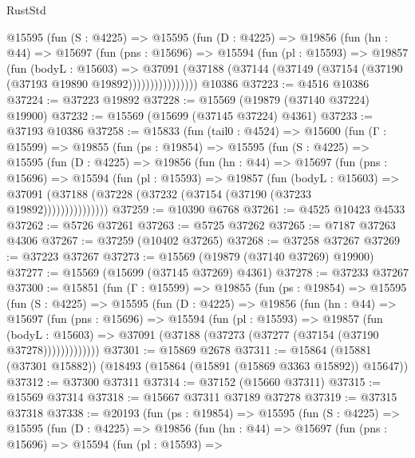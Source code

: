 \begin{lexlean}{RustStd}
\begin{coremodule}
          @15595
            (fun (S : @4225) =>
            @15595
              (fun (D : @4225) =>
              @19856
                (fun (hn : @44) =>
                @15697
                  (fun (pns : @15696) =>
                  @15594
                    (fun (pl : @15593) =>
                    @19857
                      (fun (bodyL : @15603) =>
                      @37091
                        (@37188
                          (@37144 (@37149 (@37154 (@37190 (@37193 @19890 @19892))))))))))))))))
    @10386
@37223 := @4516 @10386
@37224 := @37223 @19892
@37228 := @15569 (@19879 (@37140 @37224) @19900)
@37232 := @15569 (@15699 (@37145 @37224) @4361)
@37233 := @37193 @10386
@37258 := @15833
    (fun (tail0 : @4524) =>
    @15600
      (fun (Γ : @15599) =>
      @19855
        (fun (ps : @19854) =>
        @15595
          (fun (S : @4225) =>
          @15595
            (fun (D : @4225) =>
            @19856
              (fun (hn : @44) =>
              @15697
                (fun (pns : @15696) =>
                @15594
                  (fun (pl : @15593) =>
                  @19857
                    (fun (bodyL : @15603) =>
                    @37091 (@37188 (@37228 (@37232 (@37154 (@37190 (@37233 @19892)))))))))))))))
@37259 := @10390 @6768
@37261 := @4525 @10423 @4533
@37262 := @5726 @37261
@37263 := @5725 @37262
@37265 := @7187 @37263 @4306
@37267 := @37259 (@10402 @37265)
@37268 := @37258 @37267
@37269 := @37223 @37267
@37273 := @15569 (@19879 (@37140 @37269) @19900)
@37277 := @15569 (@15699 (@37145 @37269) @4361)
@37278 := @37233 @37267
@37300 := @15851
    (fun (Γ : @15599) =>
    @19855
      (fun (ps : @19854) =>
      @15595
        (fun (S : @4225) =>
        @15595
          (fun (D : @4225) =>
          @19856
            (fun (hn : @44) =>
            @15697
              (fun (pns : @15696) =>
              @15594
                (fun (pl : @15593) =>
                @19857
                  (fun (bodyL : @15603) =>
                  @37091 (@37188 (@37273 (@37277 (@37154 (@37190 @37278)))))))))))))
@37301 := @15869 @2678
@37311 := @15864 (@15881 (@37301 @15882)) (@18493 (@15864 (@15891 (@15869 @3363 @15892)) @15647))
@37312 := @37300 @37311
@37314 := @37152 (@15660 @37311)
@37315 := @15569 @37314
@37318 := @15667 @37311 @37189 @37278
@37319 := @37315 @37318
@37338 := @20193
    (fun (ps : @19854) =>
    @15595
      (fun (S : @4225) =>
      @15595
        (fun (D : @4225) =>
        @19856
          (fun (hn : @44) =>
          @15697
            (fun (pns : @15696) =>
            @15594
              (fun (pl : @15593) =>

\end{coremodule}
\end{lexlean}
